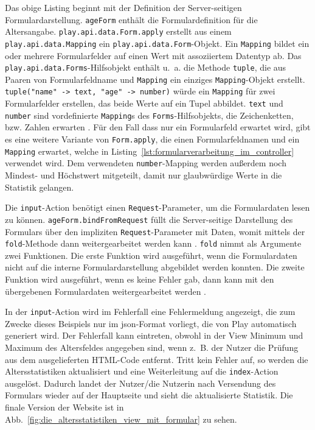 Das obige Listing beginnt mit der Definition der Server-seitigen Formulardarstellung.
\lstinline|ageForm| enthält die Formulardefinition für die Altersangabe.
\lstinline|play.api.data.Form.apply| erstellt aus einem \lstinline|play.api.data.Mapping| ein \lstinline|play.api.data.Form|-Objekt.
Ein \lstinline|Mapping| bildet ein oder mehrere Formularfelder auf einen Wert mit assoziiertem Datentyp ab.
Das \lstinline|play.api.data.Forms|-Hilfsobjekt enthält u.~a. die Methode \lstinline|tuple|, die aus Paaren von Formularfeldname und \lstinline|Mapping| ein einziges \lstinline|Mapping|-Objekt erstellt.
\lstinline|tuple("name" -> text, "age" -> number)| würde ein \lstinline|Mapping| für zwei Formularfelder erstellen, das beide Werte auf ein Tupel abbildet.
\lstinline|text| und \lstinline|number| sind vordefinierte \lstinline|Mapping|s des \lstinline|Forms|-Hilfsobjekts, die Zeichenketten, bzw. Zahlen erwarten \cite[vgl.][S~174--175]{play_for_scala}.
Für den Fall dass nur ein Formularfeld erwartet wird, gibt es eine weitere Variante von \lstinline|Form.apply|, die einen Formularfeldnamen und ein \lstinline|Mapping| erwartet, welche in Listing~\ref{lst:formularverarbeitung_im_controller} verwendet wird.
Dem verwendeten \lstinline|number|-Mapping werden außerdem noch Mindest- und Höchstwert mitgeteilt, damit nur glaubwürdige Werte in die Statistik gelangen.

Die \lstinline|input|-Action benötigt einen \lstinline|Request|-Parameter, um die Formulardaten lesen zu können.
\lstinline|ageForm.bindFromRequest| füllt die Server-seitige Darstellung des Formulars über den impliziten \lstinline|Request|-Parameter mit Daten, womit mittels der \lstinline|fold|-Methode dann weitergearbeitet werden kann \cite[vgl.][S.~179]{play_for_scala}.
\lstinline|fold| nimmt als Argumente zwei Funktionen.
Die erste Funktion wird ausgeführt, wenn die Formulardaten nicht auf die interne Formulardarstellung abgebildet werden konnten.
Die zweite Funktion wird ausgeführt, wenn es keine Fehler gab, dann kann mit den übergebenen Formulardaten weitergearbeitet werden \cite[vgl.][S.~176]{play_for_scala}.

In der \lstinline|input|-Action wird im Fehlerfall eine Fehlermeldung angezeigt, die zum Zwecke dieses Beispiels nur im \gls{json}-Format vorliegt, die von Play automatisch generiert wird.
Der Fehlerfall kann eintreten, obwohl in der View Minimum und Maximum des Altersfeldes angegeben sind, wenn z.~B. der Nutzer die Prüfung aus dem ausgelieferten HTML-Code entfernt.
Tritt kein Fehler auf, so werden die Altersstatistiken aktualisiert und eine Weiterleitung auf die \lstinline|index|-Action ausgelöst.
Dadurch landet der Nutzer/die Nutzerin nach Versendung des Formulars wieder auf der Hauptseite und sieht die aktualisierte Statistik.
Die finale Version der Website ist in Abb.~\ref{fig:die_altersstatistiken_view_mit_formular} zu sehen.


